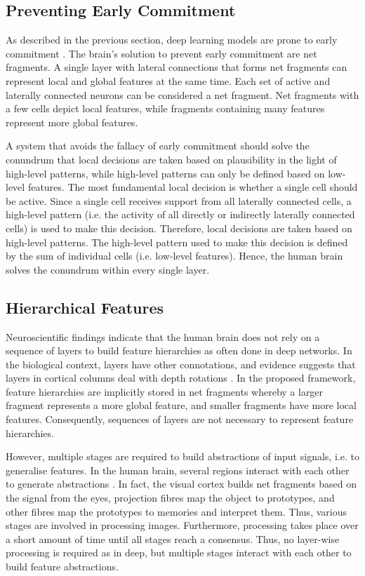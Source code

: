 \subsection{Preventing Early Commitment}
As described in the previous section, deep learning models are prone to early commitment .
The brain's solution to prevent early commitment are net fragments.
A single layer with lateral connections that forms net fragments can represent local and global features at the same time.
Each set of active and laterally connected neurons can be considered a net fragment. Net fragments with a few cells depict local features, while fragments containing many features represent more global features.

A system that avoids the fallacy of early commitment should solve the conundrum that local decisions are taken based on plausibility in the light of high-level patterns, while high-level patterns can only be defined based on low-level features.
The most fundamental local decision is whether a single cell should be active. Since a single cell receives support from all laterally connected cells, a high-level pattern (i.e. the activity of all directly or indirectly laterally connected cells) is used to make this decision. Therefore, local decisions are taken based on high-level patterns. The high-level pattern used to make this decision is defined by the sum of individual cells (i.e. low-level features). Hence, the human brain solves the conundrum within every single layer.


\subsection{Hierarchical Features}
Neuroscientific findings indicate that the human brain does not rely on a sequence of layers to build feature hierarchies as often done in deep networks.
In the biological context, layers have other connotations, and evidence suggests that layers in cortical columns deal with depth rotations .
In the proposed framework, feature hierarchies are implicitly stored in net fragments whereby a larger fragment represents a more global feature, and smaller fragments have more local features.
Consequently, sequences of layers are not necessary to represent feature hierarchies.

However, multiple stages are required to build abstractions of input signals, i.e. to generalise features.
In the human brain, several regions interact with each other to generate abstractions .
In fact, the visual cortex builds net fragments based on the signal from the eyes, projection fibres map the object to prototypes, and other fibres map the prototypes to memories and interpret them. Thus, various stages are involved in processing images.
Furthermore, processing takes place over a short amount of time until all stages reach a consensus. Thus, no layer-wise processing is required as in deep, but multiple stages interact with each other to build feature abstractions.

